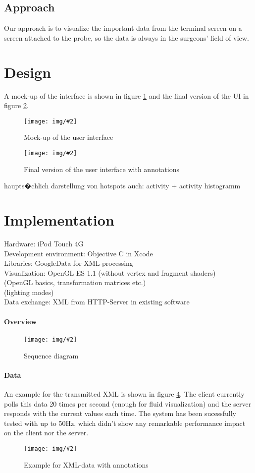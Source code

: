 \documentclass{scrartcl}
\newcommand{\red}[1]{{\color{red} #1}}
\newcommand{\graphic}[3][width=\linewidth] %
{
  \begin{figure}[h!t]
    \centering
    \texttt{[image: img/\#2]}
    \caption{#3}
    \label{fig:#2}
  \end{figure}
}
\newcommand{\refFigure}[1]{figure \ref{fig:#1}}
\begin{document}
\subsection{Approach}


Our approach is to visualize the important data from the terminal screen on a screen attached to the probe, so the data is always in the surgeons' field of view. 



\section{Design}
A mock-up of the interface is shown in \refFigure{mockup} and the final version of the UI in \refFigure{screen-annotated}.
\graphic[scale=.5]{mockup}{Mock-up of the user interface}
\graphic[scale=.5]{screen-annotated}{Final version of the user interface with annotations}
\red{haupts�chlich darstellung von hotspots
auch: activity + activity histogramm}



\section{Implementation}
Hardware: iPod Touch 4G\\
Development environment: Objective C in Xcode\\
Libraries: GoogleData for XML-processing\\
Visualization: OpenGL ES 1.1 (without vertex and fragment shaders)\\
\red{(OpenGL basics, transformation matrices etc.)\\
(lighting modes)}\\
Data exchange: XML from HTTP-Server in existing software\\

\paragraph*{Overview}
\graphic[scale=.8]{sequence-diagram}{Sequence diagram}

\paragraph*{Data}
An example for the transmitted XML is shown in \refFigure{data}. The client currently polls this data 20 times per second (enough for fluid visualization) and the server responds with the current values each time. The system has been sucessfully tested with up to 50Hz, which didn't show any remarkable performance impact on the client nor the server.
\graphic[scale=.5]{data}{Example for XML-data with annotations}
\end{document}
